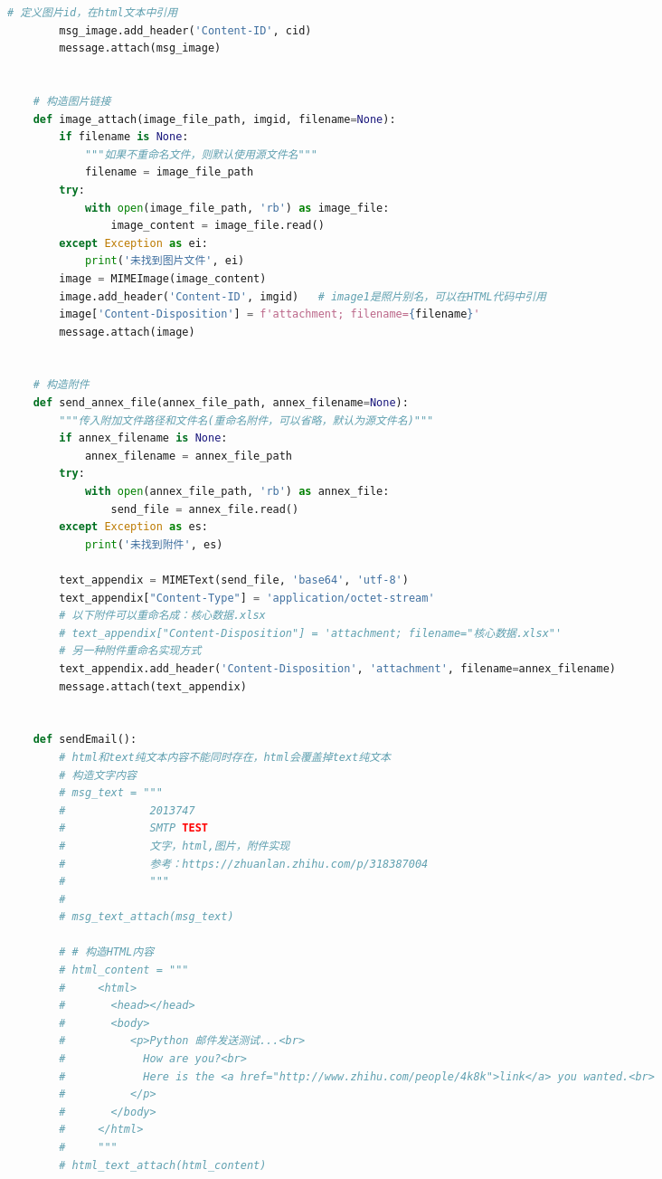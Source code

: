 \documentclass[a4paper,12pt]{report}
\begin{document}
\begin{spacing}{1.5}
\begin{spacing}{1}
\begin{lstlisting}[language={Python}]
        # 定义图片id，在html文本中引用
        msg_image.add_header('Content-ID', cid)
        message.attach(msg_image)
    
    
    # 构造图片链接
    def image_attach(image_file_path, imgid, filename=None):
        if filename is None:
            """如果不重命名文件，则默认使用源文件名"""
            filename = image_file_path
        try:
            with open(image_file_path, 'rb') as image_file:
                image_content = image_file.read()
        except Exception as ei:
            print('未找到图片文件', ei)
        image = MIMEImage(image_content)
        image.add_header('Content-ID', imgid)   # image1是照片别名，可以在HTML代码中引用
        image['Content-Disposition'] = f'attachment; filename={filename}'
        message.attach(image)
    
    
    # 构造附件
    def send_annex_file(annex_file_path, annex_filename=None):
        """传入附加文件路径和文件名(重命名附件，可以省略，默认为源文件名)"""
        if annex_filename is None:
            annex_filename = annex_file_path
        try:
            with open(annex_file_path, 'rb') as annex_file:
                send_file = annex_file.read()
        except Exception as es:
            print('未找到附件', es)
    
        text_appendix = MIMEText(send_file, 'base64', 'utf-8')
        text_appendix["Content-Type"] = 'application/octet-stream'
        # 以下附件可以重命名成：核心数据.xlsx
        # text_appendix["Content-Disposition"] = 'attachment; filename="核心数据.xlsx"'
        # 另一种附件重命名实现方式
        text_appendix.add_header('Content-Disposition', 'attachment', filename=annex_filename)
        message.attach(text_appendix)
    
    
    def sendEmail():
        # html和text纯文本内容不能同时存在，html会覆盖掉text纯文本
        # 构造文字内容
        # msg_text = """
        #             2013747
        #             SMTP TEST
        #             文字，html,图片，附件实现
        #             参考：https://zhuanlan.zhihu.com/p/318387004
        #             """
        #
        # msg_text_attach(msg_text)
    
        # # 构造HTML内容
        # html_content = """
        #     <html>
        #       <head></head>
        #       <body>
        #          <p>Python 邮件发送测试...<br>
        #            How are you?<br>
        #            Here is the <a href="http://www.zhihu.com/people/4k8k">link</a> you wanted.<br>
        #          </p>
        #       </body>
        #     </html>
        #     """
        # html_text_attach(html_content)
    

\end{lstlisting}
\end{spacing}
\end{spacing}
\end{document}
